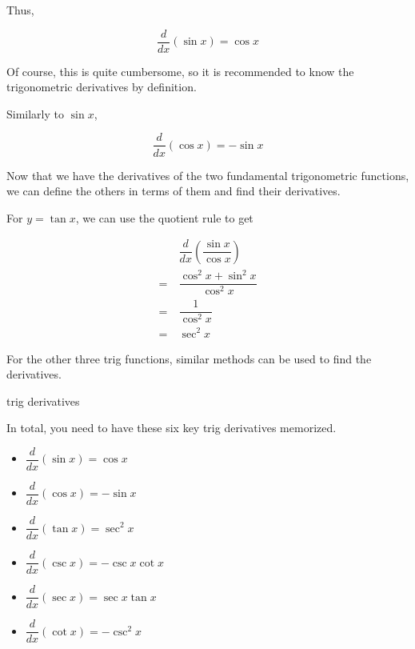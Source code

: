 Thus,

\[ \dfrac{d}{dx} \left( \sin{x} \right) = \cos{x} \]

Of course, this is quite cumbersome, so it is recommended to know the trigonometric derivatives by definition.

Similarly to \( \sin{x} \),

\[ \dfrac{d}{dx} \left( \cos{x} \right) = -\sin{x} \]

Now that we have the derivatives of the two fundamental trigonometric functions, we can define the others in terms of them and find their derivatives.

For \( y = \tan{x} \), we can use the quotient rule to get

\begin{align}
    &\dfrac{d}{dx} \left( \dfrac{\sin{x}}{\cos{x}} \right) \\
    = \> &\dfrac{\cos^2{x} + \sin^2{x}}{\cos^2{x}} \\
    = \> &\dfrac{1}{\cos^2{x}} \\
    = \> &\sec^2{x}
\end{align}

For the other three trig functions, similar methods can be used to find the derivatives.

\begin{definition}{trig derivatives}
    
    In total, you need to have these six key trig derivatives memorized.
    
    \begin{multicols}{2}
    \begin{itemize}
        \item \( \dfrac{d}{dx} \left( \sin{x} \right) = \cos{x} \)
        \item \( \dfrac{d}{dx} \left( \cos{x} \right) = -\sin{x} \)
        \item \( \dfrac{d}{dx} \left( \tan{x} \right) = \sec^2{x} \)
        \item \( \dfrac{d}{dx} \left( \csc{x} \right) = -\csc{x}\cot{x} \)
        \item \( \dfrac{d}{dx} \left( \sec{x} \right) = \sec{x}\tan{x} \)
        \item \( \dfrac{d}{dx} \left( \cot{x} \right) = -\csc^2{x} \)
    \end{itemize}
    \end{multicols}
    
    \vspace{0.1cm}
    
\end{definition}

